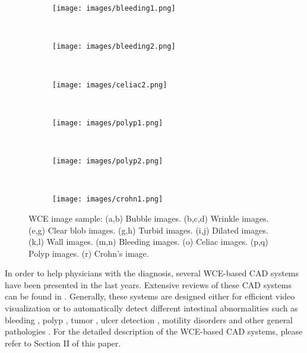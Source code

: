 \documentclass[review,12pt,3p]{elsarticle}
\begin{document}
\begin{figure}
        \begin{subfigure}[b]{0.08\textwidth}
                \texttt{[image: images/bleeding1.png]}
                \caption{}
        \end{subfigure}%
        ~
        \begin{subfigure}[b]{0.08\textwidth}
                \texttt{[image: images/bleeding2.png]}
                \caption{}
        \end{subfigure}
        ~
        \begin{subfigure}[b]{0.08\textwidth}
                \texttt{[image: images/celiac2.png]}
                \caption{}
        \end{subfigure}
        ~
        \begin{subfigure}[b]{0.08\textwidth}
                \texttt{[image: images/polyp1.png]}
                \caption{}
        \end{subfigure}
        ~
        \begin{subfigure}[b]{0.08\textwidth}
                \texttt{[image: images/polyp2.png]}
                \caption{}
                \label{fig:mouse}
        \end{subfigure}
        ~
        \begin{subfigure}[b]{0.08\textwidth}
                \texttt{[image: images/crohn1.png]}
                \caption{}
        \end{subfigure}

        \caption{WCE image sample: (a,b) Bubble images. (b,c,d)  Wrinkle images. (e,g) Clear blob images. (g,h) Turbid images. (i,j) Dilated images. (k,l) Wall images. (m,n) Bleeding images. (o) Celiac images. (p,q) Polyp images. (r) Crohn's image.}\label{fig:WCEsamples}
\end{figure}

In order to  help physicians with the diagnosis, several  WCE-based CAD systems have been presented in the last years. Extensive reviews of these CAD systems can be found  in \cite{liedlgruber2011computer,belle2013biomedical, iakovidis2015software}. Generally, these systems are designed either for efficient video visualization  \cite{mackiewicz2008wireless,chu2010epitomized,iakovidis2013efficient,drozdzal2013adaptable} or to automatically detect different intestinal abnormalities such as bleeding \cite{chen2009,6497444}, polyp \cite{polypsMamonov,yuanpolyp}, tumor \cite{tumor2006}, ulcer detection \cite{ciaccio2013implementation}, motility disorders \cite{Malagelada2015,sseguiWrinkles} and other general pathologies \cite{ciaccio2010distinguishing,6051474,malagelada2012functional,Chen2013}.  For the detailed description of the WCE-based CAD systems, please refer to Section II of this paper.
\end{document}
